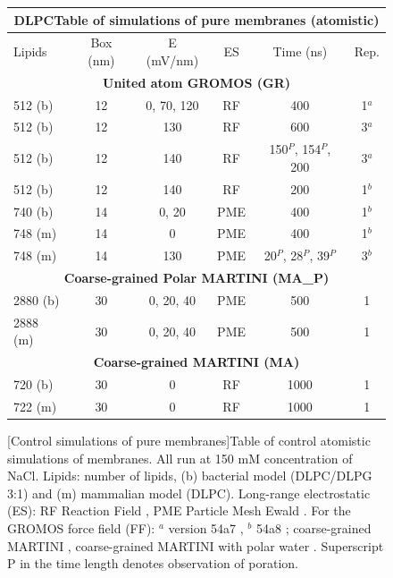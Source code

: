 \begin{figure}[h!]
\centering
\vspace{1cm}
\scriptsize
 \def\arraystretch{1.6}
\begin{tabular}{lccccc}
 \multicolumn{6}{c}{\small \textbf{DLPC​Table of simulations of pure membranes (atomistic)}} \\
  \hline
 Lipids & Box (nm) & E (mV/nm) & ES & $\,$Time (ns)$\,$ & Rep. \\
 \hline
 \multicolumn{6}{c}{\textbf{United atom GROMOS (GR)}} \\
 512 (b) & 12 & 0, 70, 120 	& RF & 400 							& 1$^a$ \\
 512 (b) & 12 & 130 			& RF & 600 							& 3$^a$ \\
 512 (b) & 12 & 140 			& RF & 150$^{P}$, 154$^{P}$, 200 	& 3$^a$ \\
 512 (b) & 12 & 140 			& RF & 200 							& 1$^b$ \\
 740 (b) & 14 & 0, 20		& PME & 400 							& 1$^b$ \\
 748 (m) & 14 & 0			& PME & 400							& 1$^b$ \\
 748 (m) & 14 & 130 			& PME & 20$^{P}$, 28$^{P}$, 39$^{P}$ & 3$^b$ \\
 \hline
 \multicolumn{6}{c}{\textbf{Coarse-grained Polar MARTINI (MA\_P)}} \\
 2880 (b) & 30 & 0, 20, 40 & PME & 500 & 1 \\
 2888 (m) & 30 & 0, 20, 40 & PME & 500 & 1 \\
 \hline
 \multicolumn{6}{c}{\textbf{Coarse-grained MARTINI (MA)}} \\
 720 (b) & 30 & 0 & RF & 1000 & 1 \\
 722 (m) & 30 & 0 & RF & 1000 & 1 \\
 \hline
\end{tabular}
\vspace{0.5cm}
[Control simulations of pure membranes]{Table of control atomistic simulations of membranes. All run at 150 mM concentration of NaCl. 
%
Lipids: number of lipids, (b) bacterial model (DLPC/DLPG 3:1) and (m) mammalian model (DLPC).
%
Long-range electrostatic (ES): RF Reaction Field \citep{Tironi1995}, PME Particle Mesh Ewald \citep{Essmann1995}.
%
For the GROMOS force field (FF): $^a$ version 54a7 \citep{Schmid2011}, $^b$ 54a8 \citep{Reif2012}; coarse-grained MARTINI \citep{Marrink2007, Monticelli2008}, coarse-grained MARTINI with polar water \citep{Yesylevskyy2010}.
%
Superscript P in the time length denotes observation of poration.}
\label{table:SI_membrane}
\end{figure}
